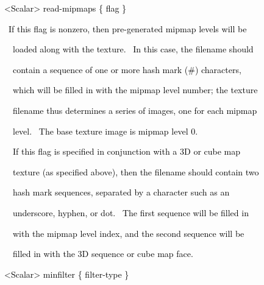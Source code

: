 \documentclass[a4paper]{article}
\newcommand\textstyleOOoComputerKeyWord[1]{\textrm{\textcolor[rgb]{0.0,0.0,0.5019608}{#1}}}
\begin{document}
\bigskip

\clearpage
\bigskip

{\color{black}
\textstyleOOoComputerKeyWord{\textcolor{black}{\ \ {\textless}Scalar{\textgreater} read-mipmaps \{ flag \}}}}


\bigskip

{\color{black}
\textstyleOOoComputerKeyWord{\textcolor{black}{\ \ \ If this flag is nonzero, then pre-generated mipmap levels will
be}}}

{\color{black}
\textstyleOOoComputerKeyWord{\textcolor{black}{\ \ \ \ loaded along with the texture. \ In this case, the filename
should}}}

{\color{black}
\textstyleOOoComputerKeyWord{\textcolor{black}{\ \ \ \ contain a sequence of one or more hash mark
({\textquotedbl}\#{\textquotedbl}) characters,}}}

{\color{black}
\textstyleOOoComputerKeyWord{\textcolor{black}{\ \ \ \ which will be filled in with the mipmap level number; the
texture}}}

{\color{black}
\textstyleOOoComputerKeyWord{\textcolor{black}{\ \ \ \ filename thus determines a series of images, one for each
mipmap}}}

{\color{black}
\textstyleOOoComputerKeyWord{\textcolor{black}{\ \ \ \ level. \ The base texture image is mipmap level 0.}}}


\bigskip

{\color{black}
\textstyleOOoComputerKeyWord{\textcolor{black}{\ \ \ \ If this flag is specified in conjunction with a 3D or cube map}}}

{\color{black}
\textstyleOOoComputerKeyWord{\textcolor{black}{\ \ \ \ texture (as specified above), then the filename should contain
two}}}

{\color{black}
\textstyleOOoComputerKeyWord{\textcolor{black}{\ \ \ \ hash mark sequences, separated by a character such as an}}}

{\color{black}
\textstyleOOoComputerKeyWord{\textcolor{black}{\ \ \ \ underscore, hyphen, or dot. \ The first sequence will be filled
in}}}

{\color{black}
\textstyleOOoComputerKeyWord{\textcolor{black}{\ \ \ \ with the mipmap level index, and the second sequence will be}}}

{\color{black}
\textstyleOOoComputerKeyWord{\textcolor{black}{\ \ \ \ filled in with the 3D sequence or cube map face.}}}


\bigskip

{\color{black}
\textstyleOOoComputerKeyWord{\textcolor{black}{\ \ {\textless}Scalar{\textgreater} minfilter \{ filter-type \}}}}
\end{document}
